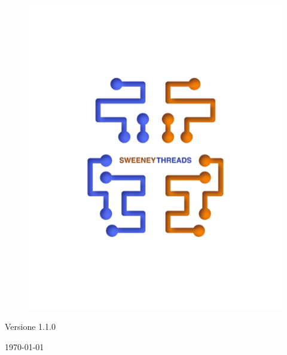 \documentclass[a4paper]{report}
\begin{document}
\begin{titlepage}
		\begin{figure}[h!]
			\centering
			\includegraphics[scale=0.8]{sweeney.png}
		\end{figure}
		\begin{center}
			Versione 1.1.0
		\end{center}
		{\large \today}\\[3cm] 
		\vfill  
	\end{titlepage}
	
	
	\tableofcontents
	
\end{document}
